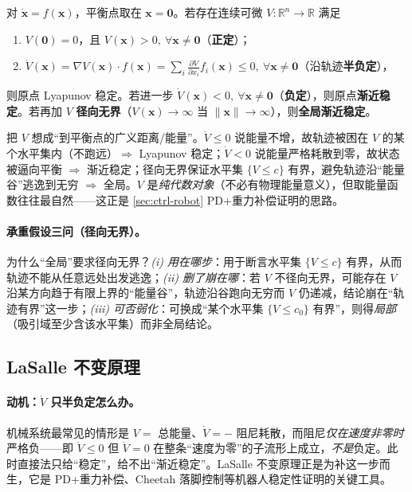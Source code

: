\begin{theorem}
\label{thm:ctrl-lyap-direct}
对 $\dot{\mathbf{x}}=f(\mathbf{x})$，平衡点取在 $\mathbf{x}=\mathbf{0}$。若存在连续可微 $V:\mathbb{R}^n\to\mathbb{R}$ 满足
\begin{enumerate}
  \item $V(\mathbf{0})=0$，且 $V(\mathbf{x})>0,\ \forall\mathbf{x}\neq\mathbf{0}$（\textbf{正定}）；
  \item $\dot V(\mathbf{x})=\nabla V(\mathbf{x})\cdot f(\mathbf{x})=\sum_{i}\frac{\partial V}{\partial x_i}f_i(\mathbf{x})\le0,\ \forall\mathbf{x}\neq\mathbf{0}$（沿轨迹\textbf{半负定}），
\end{enumerate}
则原点 Lyapunov 稳定。若进一步 $\dot V(\mathbf{x})<0,\ \forall\mathbf{x}\neq\mathbf{0}$（\textbf{负定}），则原点\textbf{渐近稳定}。若再加 $V$ \textbf{径向无界}（$V(\mathbf{x})\to\infty$ 当 $\|\mathbf{x}\|\to\infty$），则\textbf{全局渐近稳定}。
\end{theorem}

\begin{insight}
把 $V$ 想成“到平衡点的广义距离/能量”。$\dot V\le0$ 说能量不增，故轨迹被困在 $V$ 的某个水平集内（不跑远）$\Rightarrow$ Lyapunov 稳定；$\dot V<0$ 说能量严格耗散到零，故状态被逼向平衡 $\Rightarrow$ 渐近稳定；径向无界保证水平集 $\{V\le c\}$ 有界，避免轨迹沿“能量谷”逃逸到无穷 $\Rightarrow$ 全局。$V$ 是\emph{纯代数对象}（不必有物理能量意义），但取能量函数往往最自然——这正是 \cref{sec:ctrl-robot} PD+重力补偿证明的思路。
\end{insight}

\paragraph{承重假设三问（径向无界）。}
为什么“全局”要求径向无界？\emph{(i) 用在哪步}：用于断言水平集 $\{V\le c\}$ 有界，从而轨迹不能从任意远处出发逃逸；\emph{(ii) 删了崩在哪}：若 $V$ 不径向无界，可能存在 $V$ 沿某方向趋于有限上界的“能量谷”，轨迹沿谷跑向无穷而 $V$ 仍递减，结论崩在“轨迹有界”这一步；\emph{(iii) 可否弱化}：可换成“某个水平集 $\{V\le c_0\}$ 有界”，则得\emph{局部}（吸引域至少含该水平集）而非全局结论。

\subsection{LaSalle 不变原理}
\label{sec:ctrl-lasalle}

\paragraph{动机：$\dot V$ 只半负定怎么办。}
机械系统最常见的情形是 $V=$ 总能量、$\dot V=-$ 阻尼耗散，而阻尼\emph{仅在速度非零时}严格负——即 $\dot V\le0$ 但 $\dot V=0$ 在整条“速度为零”的子流形上成立，\emph{不是}负定。此时直接法只给“稳定”，给不出“渐近稳定”。LaSalle 不变原理正是为补这一步而生，它是 PD+重力补偿、Cheetah 落脚控制等机器人稳定性证明的关键工具\cite{khalil2002nonlinear}。

